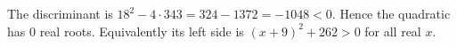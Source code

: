 The discriminant is $18^2-4\cdot343=324-1372=-1048<0$. Hence the quadratic has $\boxed0$ real roots. Equivalently its left side is $(x+9)^2+262>0$ for all real $x$.
